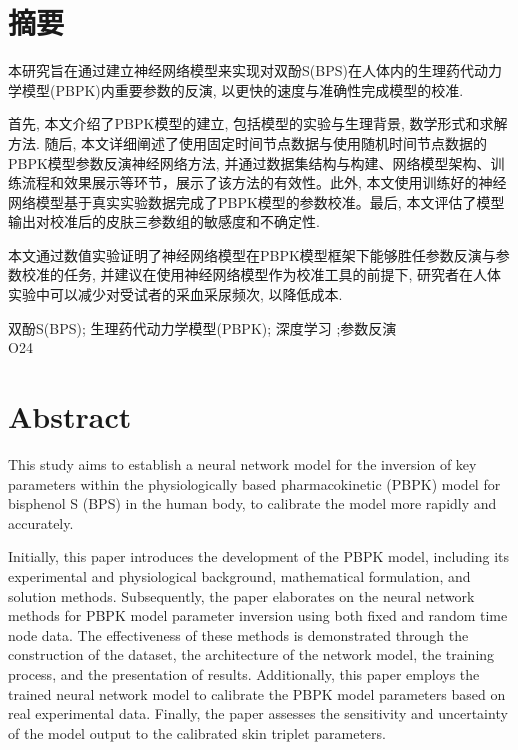 \documentclass[a4paper,punct=banjiao,twoside]{ctexrep}
\theoremstyle{plain}
\theoremstyle{definition}
\theoremstyle{remark}
\begin{document}
\renewcommand{\contentsname}{目\quad 录}
\tableofcontents
\setcounter{page}{1}

\chapter*{摘\quad 要}
\normalsize

本研究旨在通过建立神经网络模型来实现对双酚S(BPS)在人体内的生理药代动力学模型(PBPK)内重要参数的反演, 以更快的速度与准确性完成模型的校准. 

首先, 本文介绍了PBPK模型的建立, 包括模型的实验与生理背景, 数学形式和求解方法. 随后, 本文详细阐述了使用固定时间节点数据与使用随机时间节点数据的PBPK模型参数反演神经网络方法, 并通过数据集结构与构建、网络模型架构、训练流程和效果展示等环节，展示了该方法的有效性。此外, 本文使用训练好的神经网络模型基于真实实验数据完成了PBPK模型的参数校准。最后, 本文评估了模型输出对校准后的皮肤三参数组的敏感度和不确定性.

本文通过数值实验证明了神经网络模型在PBPK模型框架下能够胜任参数反演与参数校准的任务, 并建议在使用神经网络模型作为校准工具的前提下, 研究者在人体实验中可以减少对受试者的采血采尿频次, 以降低成本. 



 双酚S(BPS); 生理药代动力学模型(PBPK);  深度学习 ;参数反演\\
 O24


\chapter*{Abstract}
\normalsize

\iffalse
This study aims to establish a neural network model for the inversion of key parameters within the physiologically based pharmacokinetic (PBPK) model for bisphenol S (BPS) in the human body, to calibrate the model more rapidly and accurately.

Initially, this paper introduces the development of the PBPK model, including its experimental and physiological background, mathematical formulation, and solution methods. Subsequently, the paper elaborates on the neural network methods for PBPK model parameter inversion using both fixed and random time node data. The effectiveness of these methods is demonstrated through the construction of the dataset, the architecture of the network model, the training process, and the presentation of results. Additionally, this paper employs the trained neural network model to calibrate the PBPK model parameters based on real experimental data. Finally, the paper assesses the sensitivity and uncertainty of the model output  to the calibrated skin triplet parameters.
\end{document}
